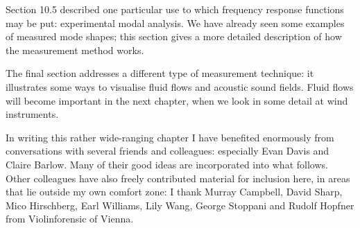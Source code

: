   Section 10.5 described one particular use to which frequency response 
  functions may be put: experimental modal analysis. We have already seen some 
  examples of measured mode shapes; this section gives a more detailed 
  description of how the measurement method works. 

  The final section addresses a different type of measurement technique: it 
  illustrates some ways to visualise fluid flows and acoustic sound fields. 
  Fluid flows will become important in the next chapter, when we look in some 
  detail at wind instruments. 

  In writing this rather wide-ranging chapter I have benefited enormously from 
  conversations with several friends and colleagues: especially Evan Davis and 
  Claire Barlow. Many of their good ideas are incorporated into what follows. 
  Other colleagues have also freely contributed material for inclusion here, in 
  areas that lie outside my own comfort zone: I thank Murray Campbell, David 
  Sharp, Mico Hirschberg, Earl Williams, Lily Wang, George Stoppani and Rudolf 
  Hopfner from Violinforensic of Vienna. 

